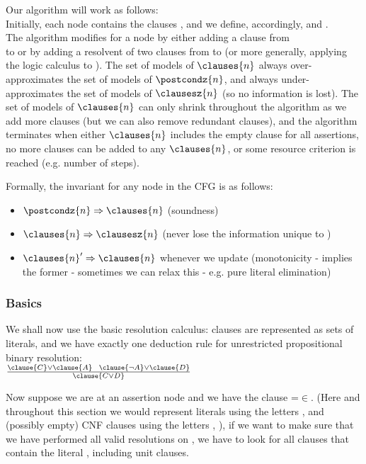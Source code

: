 Our algorithm will work as follows:\\
Initially, each node  contains the clauses , and we define, accordingly,  and .  \\
The algorithm modifies  for a node by either adding a clause from \\ 
 to  or by adding a resolvent of two clauses from  to  (or more generally, applying the logic calculus to ).
The set of models of $\clauses{n}$ always over-approximates the set of models of $\postcondz{n}$, and always under-approximates the set of models of $\clausesz{n}$ (so no information is lost).
The set of models of $\clauses{n}$ can only shrink throughout the algorithm as we add more clauses (but we can also remove redundant clauses), and the algorithm terminates when either $\clauses{n}$ includes the empty clause for all assertions, no more clauses can be added to any $\clauses{n}$, or some resource criterion is reached (e.g. number of steps).

Formally, the invariant for any node  in the CFG is as follows:
\begin{itemize}
	\item $\postcondz{n} \Rightarrow \clauses{n}$   (soundness)
	\item $\clauses{n} \Rightarrow \clausesz{n}$ (never lose the information unique to )
	\item $\clauses{n}' \Rightarrow \clauses{n}$ whenever we update  (monotonicity - implies the former - sometimes we can relax this - e.g. pure literal elimination)
\end{itemize}

\subsubsection{Basics}
We shall now use the basic resolution calculus: clauses are represented as sets of literals, and we have exactly one deduction rule for unrestricted propositional binary resolution:\\
$\frac{\clause{C}\lor\clause{A}~~\clause{\lnot A}\lor\clause{D}}{\clause{C\lor D}}$

\noindent
Now suppose we are at an assertion node  and we have the clause =$\in$.
(Here and throughout this section we would represent literals using the letters , and (possibly empty) CNF clauses using the letters , ), if we want to make sure that we have performed all valid resolutions on , we have to look for all clauses that contain the literal , including unit clauses.

